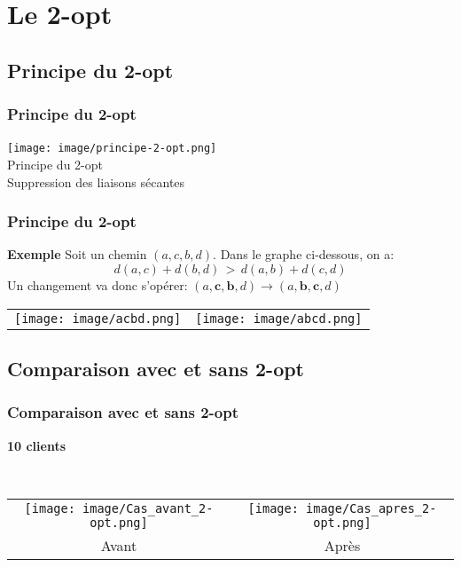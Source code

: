 \documentclass[10pt]{beamer}
\begin{document}
	\section{Le 2-opt}

	\subsection{Principe du 2-opt}

	\begin{frame}
		\frametitle{Principe du 2-opt}
			\begin{center}
				\texttt{[image: image/principe-2-opt.png]}
				\  \\Principe du 2-opt\\Suppression des liaisons sécantes
			\end{center}
	\end{frame}
	\begin{frame}
		\frametitle{Principe du 2-opt}
		\begin{exampleblock}{\textbf{Exemple}}
			Soit un chemin \((a,c,b,d)\). Dans le graphe ci-dessous, on a:
			\[d(a,c) + d(b,d)\, >\, d(a,b) + d(c,d)\] Un changement va donc s'opérer: \((a,\textbf{c},\textbf{b},d) \rightarrow (a,\textbf{b},\textbf{c},d)\) \\
			\begin{center}
				\begin{tabular}{cc}
					\texttt{[image: image/acbd.png]}
					& \pause%
					\quad \quad \quad \texttt{[image: image/abcd.png]}
				\end{tabular}
			\end{center}
		\end{exampleblock}
	\end{frame}

	\subsection{Comparaison avec et sans 2-opt}
	
	\begin{frame}
		\frametitle{Comparaison avec et sans 2-opt}
		\begin{center}
		\textbf{10 clients}
		\end{center}
		\ \newline
		\begin{tabular}{cc}
			\texttt{[image: image/Cas\_avant\_2-opt.png]}
			&
			\texttt{[image: image/Cas\_apres\_2-opt.png]}
			\\                                                     
			Avant&Après
		\end{tabular}
	\end{frame}
	
\end{document}
